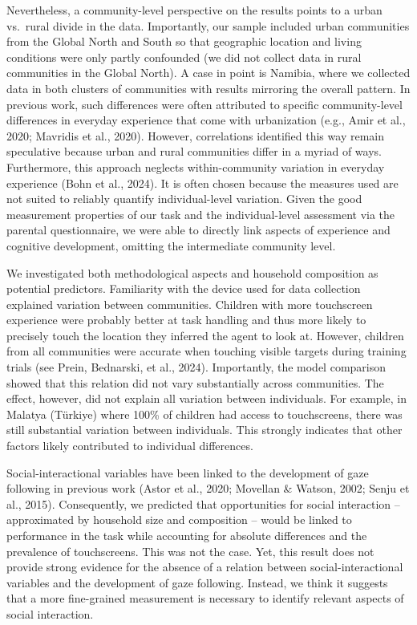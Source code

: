 \documentclass[
  man,floatsintext]{apa7}
\begin{document}
Nevertheless, a community-level perspective on the results points to a urban vs.~rural divide in the data. Importantly, our sample included urban communities from the Global North and South so that geographic location and living conditions were only partly confounded (we did not collect data in rural communities in the Global North). A case in point is Namibia, where we collected data in both clusters of communities with results mirroring the overall pattern. In previous work, such differences were often attributed to specific community-level differences in everyday experience that come with urbanization (e.g., Amir et al., 2020; Mavridis et al., 2020). However, correlations identified this way remain speculative because urban and rural communities differ in a myriad of ways. Furthermore, this approach neglects within-community variation in everyday experience (Bohn et al., 2024). It is often chosen because the measures used are not suited to reliably quantify individual-level variation. Given the good measurement properties of our task and the individual-level assessment via the parental questionnaire, we were able to directly link aspects of experience and cognitive development, omitting the intermediate community level.

We investigated both methodological aspects and household composition as potential predictors. Familiarity with the device used for data collection explained variation between communities. Children with more touchscreen experience were probably better at task handling and thus more likely to precisely touch the location they inferred the agent to look at. However, children from all communities were accurate when touching visible targets during training trials (see Prein, Bednarski, et al., 2024). Importantly, the model comparison showed that this relation did not vary substantially across communities. The effect, however, did not explain all variation between individuals. For example, in Malatya (Türkiye) where 100\% of children had access to touchscreens, there was still substantial variation between individuals. This strongly indicates that other factors likely contributed to individual differences.

Social-interactional variables have been linked to the development of gaze following in previous work (Astor et al., 2020; Movellan \& Watson, 2002; Senju et al., 2015). Consequently, we predicted that opportunities for social interaction -- approximated by household size and composition -- would be linked to performance in the task while accounting for absolute differences and the prevalence of touchscreens. This was not the case. Yet, this result does not provide strong evidence for the absence of a relation between social-interactional variables and the development of gaze following. Instead, we think it suggests that a more fine-grained measurement is necessary to identify relevant aspects of social interaction.
\end{document}
